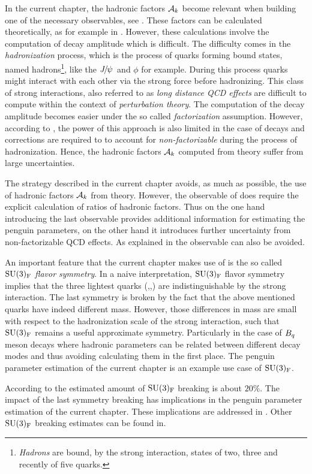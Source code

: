 In the current chapter, the hadronic factors $\mathcal{A}_{k}$ become relevant when building
one of the necessary observables, see . These factors can be calculated
theoretically, as for example in \cite{DeBruyn-thesis}. However, these calculations involve
the computation of \BJpsiX decay amplitude which is difficult. The difficulty comes in the
{\it hadronization} process, which is the process of quarks forming bound states, named
hadrons\footnote{ {\it Hadrons} are bound, by the strong interaction, states of two,
three and recently\cite{Aaij:2016nsc} of five quarks.}, like the ${J\mskip -3mu/\mskip -2mu\psi\mskip 2mu}$ and $\phi$ for example.
During this process quarks might interact with each other via the strong force before hadronizing.
This class of strong interactions, also referred to as {\it long distance QCD effects}
are difficult to compute within the context of {\it perturbation theory}.
The computation of the \BJpsiX decay amplitude becomes easier under the so called
{\it factorization} assumption\cite{HAAN1970448,Wirbel1985,CABIBBO1978418,FAKIROV1978315}.
However, according to \cite{DeBruyn-thesis},
the power of this approach is also limited in the case of \BJpsiX decays and corrections
are required to to account for {\it non-factorizable} during the process of hadronization.
Hence, the hadronic factors $\mathcal{A}_{k}$ computed from theory suffer from large uncertainties.

The strategy described in the current chapter avoids, as much as possible, the use of hadronic
factors $\mathcal{A}_{k}$ from theory. However, the observable of 
does require the explicit calculation of ratios of hadronic factors. Thus on the one hand
introducing the last observable provides additional information for estimating the penguin
parameters, on the other hand it introduces further uncertainty from non-factorizable QCD effects.
As explained in  the observable  can also be avoided.

An important feature that the current chapter makes use of is the so called
$\mathrm{SU}(3)_{\rm F}$ {\it flavor symmetry}\cite{GELLMANN1964214,NEEMAN1961222}.
In a naive interpretation, $\mathrm{SU}(3)_{\rm F}$ flavor symmetry implies that the three lightest quarks (\uquark,\dquark,\squark)
are indistinguishable by the strong interaction. The last symmetry is broken by the fact that the above
mentioned quarks have indeed different mass. However, those differences in mass are small with respect
to the hadronization scale \lqcd of the strong interaction, such that $\mathrm{SU}(3)_{\rm F}$
remains a useful approximate symmetry. Particularly in the case of $B_q$ meson decays where hadronic
parameters can be related between different decay modes and thus avoiding calculating them in the first place.
The penguin parameter estimation of the current chapter is an example use case of $\mathrm{SU}(3)_{\rm F}$.

According to\cite{Nagashima:2007qn,Gronau:2013mda} the estimated amount of $\mathrm{SU}(3)_{\rm F}$ breaking is about $20\%$.
The impact of the last symmetry breaking has implications in the penguin parameter estimation
of the current chapter. These implications are addressed in .
Other $\mathrm{SU}(3)_{\rm F}$ breaking estimates can be found in\cite{Charles:2015gya,PDG}.
